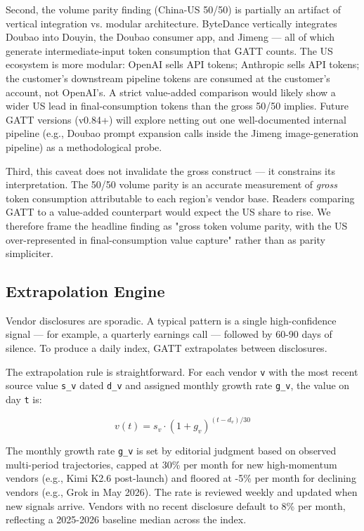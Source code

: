 \documentclass[11pt,a4paper]{article}
\begin{document}
Second, the volume parity finding (China-US 50/50) is partially an artifact of vertical integration vs. modular architecture. ByteDance vertically integrates Doubao into Douyin, the Doubao consumer app, and Jimeng --- all of which generate intermediate-input token consumption that GATT counts. The US ecosystem is more modular: OpenAI sells API tokens; Anthropic sells API tokens; the customer's downstream pipeline tokens are consumed at the customer's account, not OpenAI's. A strict value-added comparison would likely show a wider US lead in final-consumption tokens than the gross 50/50 implies. Future GATT versions (v0.84+) will explore netting out one well-documented internal pipeline (e.g., Doubao prompt expansion calls inside the Jimeng image-generation pipeline) as a methodological probe.

Third, this caveat does not invalidate the gross construct --- it constrains its interpretation. The 50/50 volume parity is an accurate measurement of \emph{gross} token consumption attributable to each region's vendor base. Readers comparing GATT to a value-added counterpart would expect the US share to rise. We therefore frame the headline finding as "gross token volume parity, with the US over-represented in final-consumption value capture" rather than as parity simpliciter.

\subsection{Extrapolation Engine}

Vendor disclosures are sporadic. A typical pattern is a single high-confidence signal --- for example, a quarterly earnings call --- followed by 60-90 days of silence. To produce a daily index, GATT extrapolates between disclosures.

The extrapolation rule is straightforward. For each vendor \texttt{v} with the most recent source value \texttt{s\_v} dated \texttt{d\_v} and assigned monthly growth rate \texttt{g\_v}, the value on day \texttt{t} is:

\begin{equation*}
 v(t) = s_v \cdot (1 + g_v)^{(t - d_v)/30} 
\end{equation*}

The monthly growth rate \texttt{g\_v} is set by editorial judgment based on observed multi-period trajectories, capped at 30\% per month for new high-momentum vendors (e.g., Kimi K2.6 post-launch) and floored at -5\% per month for declining vendors (e.g., Grok in May 2026). The rate is reviewed weekly and updated when new signals arrive. Vendors with no recent disclosure default to 8\% per month, reflecting a 2025-2026 baseline median across the index.
\end{document}
